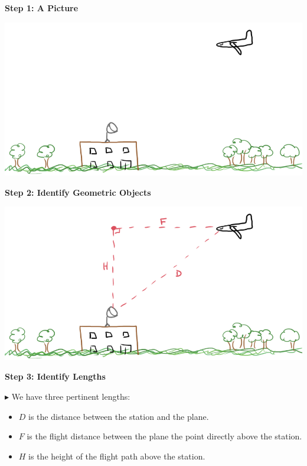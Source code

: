 \documentclass{ximera}
\begin{document}
\textbf{\textcolor{purple!85!blue}{Step 1: A Picture}}


\begin{image}
\includegraphics{pics/plane_1.png}
\end{image}




\textbf{\textcolor{purple!85!blue}{Step 2: Identify Geometric Objects}}



\begin{image}
\includegraphics{pics/plane_2.png}
\end{image}







\textbf{\textcolor{purple!85!blue}{Step 3: Identify Lengths}}

$\blacktriangleright$ We have three pertinent lengths:

\begin{itemize}
\item $D$ is the distance between the station and the plane.
\item $F$ is the flight distance between the plane the point directly above the station.
\item $H$ is the height of the flight path above the station.
\end{itemize}
\end{document}
